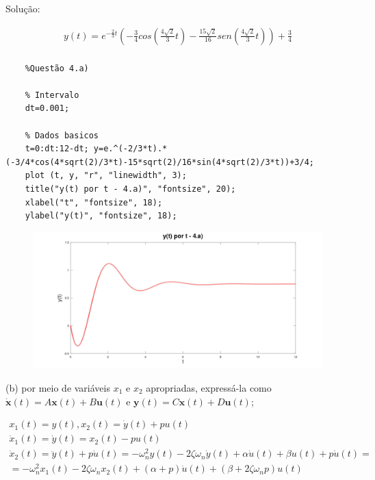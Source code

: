 \documentclass[10pt]{article}
\newcommand{\bm}[1]{\boldsymbol{#1}}
\begin{document}
Solução:

\begin{align*}
    y(t) = e^{-\frac{2}{3}t} \left(-\frac{3}{4}cos\left(\frac{4 \sqrt{2}}{3}t\right) - \frac{15 \sqrt{2}}{16} sen\left(\frac{4 \sqrt{2}}{3}t\right)\right) + \frac{3}{4} \\
\end{align*}

\begin{verbatim}
    %Questão 4.a)

    % Intervalo
    dt=0.001;

    % Dados basicos
    t=0:dt:12-dt; y=e.^(-2/3*t).*(-3/4*cos(4*sqrt(2)/3*t)-15*sqrt(2)/16*sin(4*sqrt(2)/3*t))+3/4;
    plot (t, y, "r", "linewidth", 3);
    title("y(t) por t - 4.a)", "fontsize", 20);
    xlabel("t", "fontsize", 18);
    ylabel("y(t)", "fontsize", 18);
\end{verbatim}

\begin{figure}[h]
    \includegraphics[scale=0.15]{questao4a.jpg}
    \centering
\end{figure}

\vspace{\baselineskip}

(b) por meio de variáveis $x_1$ e $x_2$ apropriadas, expressá-la como $\dot{\bm{x}}(t) = A\bm{x}(t) + B\bm{u}(t)$ e $\bm{y}(t) = C\bm{x}(t) + D\bm{u}(t)$;

\begin{align*}
    x_1(t) = y(t), x_2(t) = \dot{y}(t) + pu(t) \\
    \dot{x}_1(t) = \dot{y}(t) = x_2(t) - pu(t) \\
    \dot{x}_2(t) = \ddot{y}(t) + p\dot{u}(t) =  - \omega_n^2 y(t) - 2\zeta \omega_n \dot{y}(t) + \alpha \dot{u}(t) + \beta u(t)+  p \dot{u}(t) = \\
    = - \omega_n^2 x_1(t) -2\zeta \omega_n x_2(t) + (\alpha + p)\dot{u}(t) + (\beta + 2\zeta\omega_n p)u(t) 
\end{align*}
\end{document}
